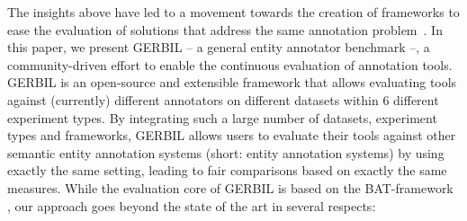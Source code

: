 The insights above have led to a movement towards the creation of frameworks to ease the evaluation of solutions that address the same annotation problem~\cite{ERD2014,cornolti}. In this paper, we present GERBIL -- a general entity annotator benchmark --, a community-driven effort to enable the continuous evaluation of annotation tools. GERBIL is an open-source and extensible framework that allows evaluating tools against (currently) \overallGERBILannotators different annotators on \overalldatasets different datasets within 6 different experiment types. 
By integrating such a large number of datasets, experiment types and frameworks, GERBIL allows users to evaluate their tools against other semantic entity annotation systems (short: entity annotation systems) by using exactly the same setting, leading to fair comparisons based on exactly the same measures. 
While the evaluation core of GERBIL is based on the BAT-framework \cite{cornolti}, our approach goes beyond the state of the art in several respects:
